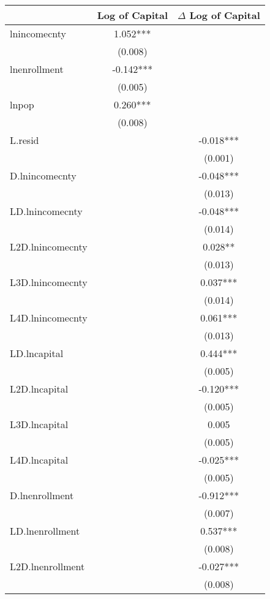 \begin{tabular}{lcc}
\hline
 & Log of Capital & $\Delta$ Log of Capital \\ 
\hline
lnincomecnty        & 1.052*** &  \\
                    & (0.008)  &  \\
lnenrollment        & -0.142*** &  \\
                    & (0.005)  &  \\
lnpop               & 0.260*** &  \\
                    & (0.008)  &  \\
L.resid             &  & -0.018*** \\
                    &  & (0.001) \\
D.lnincomecnty      &  & -0.048*** \\
                    &  & (0.013) \\
LD.lnincomecnty     &  & -0.048*** \\
                    &  & (0.014) \\
L2D.lnincomecnty    &  & 0.028** \\
                    &  & (0.013) \\
L3D.lnincomecnty    &  & 0.037*** \\
                    &  & (0.014) \\
L4D.lnincomecnty    &  & 0.061*** \\
                    &  & (0.013) \\
LD.lncapital        &  & 0.444*** \\
                    &  & (0.005) \\
L2D.lncapital       &  & -0.120*** \\
                    &  & (0.005) \\
L3D.lncapital       &  & 0.005 \\
                    &  & (0.005) \\
L4D.lncapital       &  & -0.025*** \\
                    &  & (0.005) \\
D.lnenrollment      &  & -0.912*** \\
                    &  & (0.007) \\
LD.lnenrollment     &  & 0.537*** \\
                    &  & (0.008) \\
L2D.lnenrollment    &  & -0.027*** \\
                    &  & (0.008) \\

\end{tabular}
